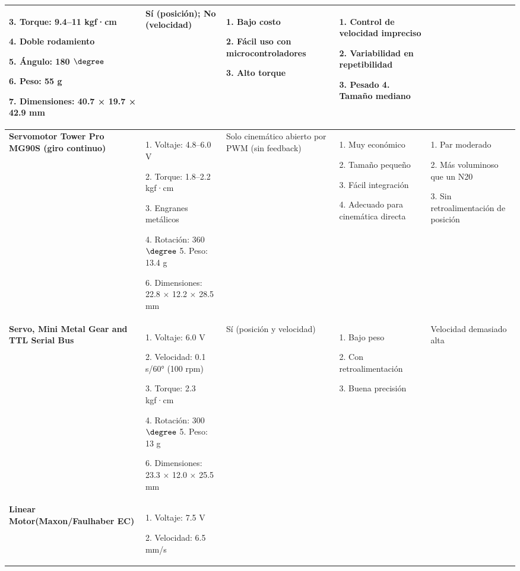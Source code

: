 \begin{longtable}{|p{2.5cm}|p{3.0cm}|p{2.0cm}|p{4.0cm}|p{4.0cm}|}
  3. Torque: 9.4–11 kgf·cm 
  
  4. Doble rodamiento 
  
  5. Ángulo: 180 $\degree$
  
  6. Peso: 55 g 
  
  7. Dimensiones: 40.7 × 19.7 × 42.9 mm
& Sí (posición); No (velocidad)
& 1. Bajo costo

  2. Fácil uso con microcontroladores
  
  3. Alto torque
& 1. Control de velocidad impreciso 

  2. Variabilidad en repetibilidad
  
  3. Pesado
  4. Tamaño mediano \\ \hline

\textbf{Servomotor Tower Pro MG90S (giro continuo)\cite{sandorobotics_mg90s_gc}}
& 1. Voltaje: 4.8–6.0 V 

  2. Torque: 1.8–2.2 kgf·cm 
  
  3. Engranes metálicos 
  
  4. Rotación: 360$\degree$ 
  5. Peso: 13.4 g 
  
  6. Dimensiones: 22.8 × 12.2 × 28.5 mm
& Solo cinemático abierto por PWM (sin feedback)
& 1. Muy económico 

  2. Tamaño pequeño 
  
  3. Fácil integración 
  
  4. Adecuado para cinemática directa
& 1. Par moderado 

  2. Más voluminoso que un N20 
  
  3. Sin retroalimentación de posición \\ \hline

\textbf{Servo, Mini Metal Gear and TTL Serial Bus \cite{aliexpress_1005005950881566}}
& 1. Voltaje: 6.0 V 

  2. Velocidad: 0.1 s/60° (100 rpm) 
  
  3. Torque: 2.3 kgf·cm 
  
  4. Rotación: 300$\degree$
  5. Peso: 13 g 
  
  6. Dimensiones: 23.3 × 12.0 × 25.5 mm
& Sí (posición y velocidad)
& 1. Bajo peso 

  2. Con retroalimentación 
  
  3. Buena precisión
& Velocidad demasiado alta \\ \hline

\textbf{Linear Motor(Maxon/Faulhaber EC)\cite{faulhaber_bldc}}
& 1. Voltaje: 7.5 V 

  2. Velocidad: 6.5 mm/s 
  

\end{longtable}
